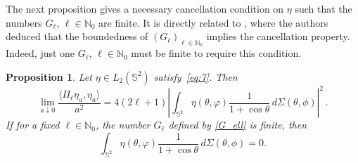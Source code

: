 \documentclass[a4paper,11pt,DIV=11,%
abstract=on%
]{scrartcl}
\newtheorem{prop}[thm]{Proposition}
\def\N{{\mathbb N}}
\newcommand{\red}[1]{#1}
\begin{document}
The next proposition gives a necessary cancellation condition on $\eta$ such that the numbers 
$G_\ell$, $\ell \in \mathbb N_0$ 
are finite. It is directly related to \cite[Prop. 3.6]{AV99}, 
where the authors  deduced that the boundedness of $(G_\ell)_{\ell\in \N_0}$ implies the cancellation property.
Indeed, just one $G_\ell$, $\ell \in \mathbb N_0$ must be finite to
require this condition. 

\begin{prop}\label{lemma-asymp-1}
  Let $\eta\in L_2(\mathbb S^2)$ \red{satisfy~\eqref{eq:7}}.
	Then 
	\begin{equation}\label{eq-necessary-limit-1}
		\lim_{a\downarrow 0}\frac{\langle \Pi_\ell \eta_a , \eta_a \rangle}{a^2}
		=4(2\ell+1)\left|\int_{\mathbb S^2} \red{\eta(\theta ,
                  \varphi) \frac{1}{1 + \cos\theta}\,
                  d\Sigma(\theta,\phi) }\right|^2\,. 
	\end{equation}
	If for a fixed $\ell \in \mathbb N_0$, 
	the number $G_\ell$ defined by \eqref{G_ell} is finite, then
	\begin{equation}
	\int_{\mathbb S^2} \red{\eta(\theta , \varphi) \frac{1}{1 + \cos\theta}\, d\Sigma(\theta,\phi)} =0.
	\end{equation}
\end{prop}        
\end{document}
